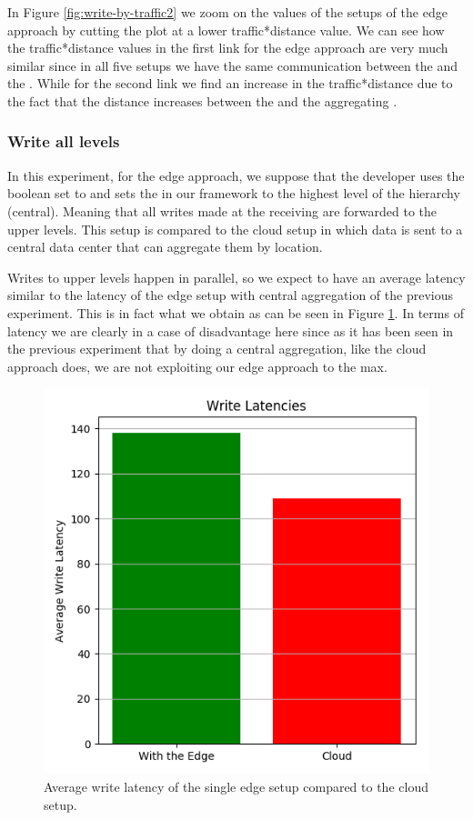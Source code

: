 In Figure \ref{fig:write-by-traffic2} we zoom on the values of the setups of the edge approach by cutting the plot at a lower traffic*distance value. We can see how the traffic*distance values in the first link for the edge approach are very much similar since in all five setups we have the same communication between the  and the . While for the second link we find an increase in the traffic*distance due to the fact that the distance increases between the  and the aggregating .


\subsubsection{Write all levels}
In this experiment, for the edge approach, we suppose that the developer uses the boolean  set to  and sets the  in our framework to the highest level of the hierarchy (central). Meaning that all writes made at the receiving   are forwarded to the upper levels. This setup is compared to the cloud setup in which data is sent to a central data center that can aggregate them by location.

Writes to upper levels happen in parallel, so we expect to have an average latency similar to the latency of the edge setup with central aggregation of the previous experiment. This is in fact what we obtain as can be seen in Figure \ref{fig:write-all-latency}. In terms of latency we are clearly in a case of disadvantage here since as it has been seen in the previous experiment that by doing a central aggregation, like the cloud approach does, we are not exploiting our edge approach to the max.

\begin{figure}[H]
    \centering
    \includegraphics[width=0.75\linewidth]{Figures/Evaluation/write-all-latency.png}
    \caption{Average write latency of the single edge setup compared to the cloud setup.}
    \label{fig:write-all-latency}
\end{figure}

